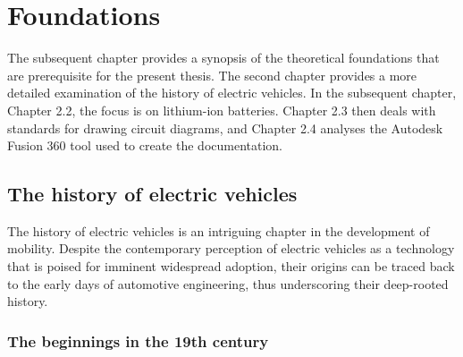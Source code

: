 \chapter{Foundations}
\label{cha:Grundlagen}



The subsequent chapter provides a synopsis of the theoretical foundations that are prerequisite for the present thesis. The second chapter provides a more detailed examination of the history of electric vehicles. In the subsequent chapter, Chapter 2.2, the focus is on lithium-ion batteries. Chapter 2.3 then deals with standards for drawing circuit diagrams, and Chapter 2.4 analyses the Autodesk Fusion 360 tool used to create the documentation.
\section{The history of electric vehicles}

The history of electric vehicles is an intriguing chapter in the development of mobility. Despite the contemporary perception of electric vehicles as a technology that is poised for imminent widespread adoption, their origins can be traced back to the early days of automotive engineering, thus underscoring their deep-rooted history.
\subsection*{The beginnings in the 19th century}

